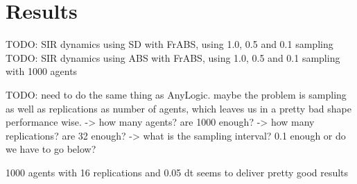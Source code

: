 \section{Results}
TODO: SIR dynamics using SD with FrABS, using 1.0, 0.5 and 0.1 sampling 
TODO: SIR dynamics using ABS with FrABS, using 1.0, 0.5 and 0.1 sampling with 1000 agents

TODO: need to do the same thing as AnyLogic. maybe the problem is sampling as well as replications as number of agents, which leaves us in a pretty bad shape performance wise.
	-> how many agents? are 1000 enough?
	-> how many replications? are 32 enough?
	-> what is the sampling interval? 0.1 enough or do we have to go below?
	
	1000 agents with 16 replications and 0.05 dt seems to deliver pretty good results